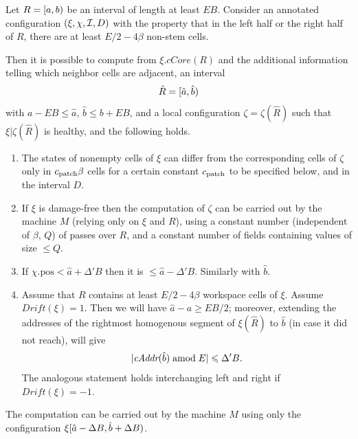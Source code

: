 \documentclass[12pt]{memoir}
\newcommand{\fld}[1]{\ensuremath{\textit{#1}}}
\def\B{B}
\newcommand{\D}{D}
\newcommand{\E}{E}
\newcommand{\pos}{\mathrm{pos}}
\newcommand{\R}{R}
\newcommand{\cAddr}{\fld{cAddr}}
\newcommand{\cCore}{\fld{cCore}}
\newcommand{\Drift}{\fld{Drift}}
\newcommand{\cns}[1]{c_{\textrm{\upshape #1}}}
\begin{document}
\begin{lemma}[Patching]\label{lem:patching}
    Let  \( \R=\lint{a}{b} \) be an interval of length at least \( \E\B \).
    Consider an
annotated configuration \(  (\xi, \chi, \cI, \D) \)  with the property that in the left half 
or the right half of \( \R \), there are at least \( \E/2-4\beta \) non-stem cells.

   Then it is possible to compute from \( \xi.\cCore(\R) \) and the additional information telling
which neighbor cells are adjacent,  an interval
\begin{align*}
   \hat \R =\lint{\hat a}{\hat b}
 \end{align*}
with \( a-\E\B\le\hat a \), \( \hat b \le b+\E\B \),
and a local configuration \( \zeta = \zeta(\hat \R) \)
such that \( \xi |\zeta(\hat \R) \) is healthy, and the following holds.

    \begin{enumerate}[\upshape (a)]
     \item
        The states of nonempty cells of \( \xi \) can differ from the corresponding cells
        of \( \zeta \) only in \( \cns{patch}\beta \) cells for a certain constant
        \( \cns{patch} \)  to be specified below, and in the interval \( \D \).

     \item
        If \( \xi \) is damage-free then the 
        computation of \( \zeta \) can be carried out by the machine \( M \)
        (relying only on \( \xi \) and \( \R \)), using a
        constant number (independent of \( \beta \), \( Q \))
        of passes over \( \R \), and a constant number
        of fields containing values of size \( \le Q \).

   \item\label{i:patching.inside}
       If \( \chi.\pos < \hat a +\Delta'\B \) then it is \( \le \hat a - \Delta'\B \).
       Similarly with \( \hat b \).

       \item\label{i:patching.align}
         Assume that \( \R \) contains at least \( E/2-4\beta \) workspace cells of \( \xi \).
       Assume \( \Drift(\xi)=1 \).
       Then we will have \( \hat a-a\ge\E\B/2 \); moreover, extending the addresses of the 
       rightmost homogenous segment of \( \xi(\hat\R) \) to \( \hat b \) 
       (in case it did not reach), will give
 \begin{align*}
   |\cAddr(\hat b) \amod \E|\le \Delta'\B.
 \end{align*}
 The analogous statement holds interchanging left and right if \( \Drift(\xi)=-1 \).
      \end{enumerate}
The computation can be carried out by the machine \( M \) using only the configuration
\( \xi\lint{\hat a-\Delta\B}{\hat b+\Delta\B} \).
\end{lemma}
\end{document}
